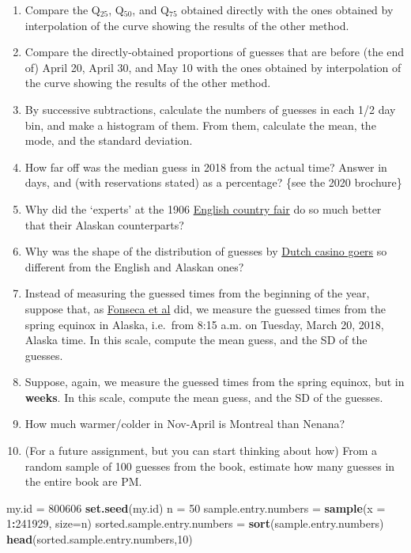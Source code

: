 \documentclass[]{book}
\newenvironment{Shaded}{\begin{snugshade}}{\end{snugshade}}
\newcommand{\DataTypeTok}[1]{\textcolor[rgb]{0.13,0.29,0.53}{#1}}
\newcommand{\DecValTok}[1]{\textcolor[rgb]{0.00,0.00,0.81}{#1}}
\newcommand{\KeywordTok}[1]{\textcolor[rgb]{0.13,0.29,0.53}{\textbf{#1}}}
\newcommand{\NormalTok}[1]{#1}
\newcommand{\OperatorTok}[1]{\textcolor[rgb]{0.81,0.36,0.00}{\textbf{#1}}}
\newcommand{\StringTok}[1]{\textcolor[rgb]{0.31,0.60,0.02}{#1}}
\begin{document}
\begin{enumerate}
\def\labelenumi{\arabic{enumi}.}
\setcounter{enumi}{2}
\item
  Compare the Q\(_{25}\), Q\(_{50}\), and Q\(_{75}\) obtained directly with the ones obtained by interpolation of the curve showing the results of the other method.
\item
  Compare the directly-obtained proportions of guesses that are before (the end of) April 20, April 30, and May 10 with the ones obtained by interpolation of the curve showing the results of the other method.
\item
  By successive subtractions, calculate the numbers of guesses in each 1/2 day bin, and make a histogram of them. From them, calculate the mean, the mode, and the standard deviation.
\item
  How far off was the median guess in 2018 from the actual time? Answer in days, and (with reservations stated) as a percentage? \{see the 2020 brochure\}
\item
  Why did the `experts' at the 1906 \href{http://galton.org/essays/1900-1911/galton-1907-vox-populi.pdf}{English country fair} do so much better that their Alaskan counterparts?
\item
  Why was the shape of the distribution of guesses by \href{http://www.medicine.mcgill.ca/epidemiology/hanley/bios691/The_wisdom_of_the_inner_crowd_.pdf}{Dutch casino goers} so different from the English and Alaskan ones?
\item
  Instead of measuring the guessed times from the beginning of the year, suppose that, as \href{http://www.medicine.mcgill.ca/epidemiology/hanley/bios691/VoxPopuliNenana.pdf}{Fonseca et al}
  did, we measure the guessed times from the spring equinox in Alaska, i.e.~from 8:15 a.m. on Tuesday, March 20, 2018, Alaska time. In this scale, compute the mean guess, and the SD of the guesses.
\item
  Suppose, again, we measure the guessed times from the spring equinox, but in \textbf{weeks}. In this scale, compute the mean guess, and the SD of the guesses.
\item
  How much warmer/colder in Nov-April is Montreal than Nenana?
\item
  (For a future assignment, but you can start thinking about how) From a random sample of 100 guesses from the book, estimate how many guesses in the entire book are PM.
\end{enumerate}

\begin{Shaded}
\begin{Highlighting}[]
\NormalTok{my.id =}\StringTok{ }\DecValTok{800606}
\KeywordTok{set.seed}\NormalTok{(my.id)}
\NormalTok{n =}\StringTok{ }\DecValTok{50}
\NormalTok{sample.entry.numbers =}\StringTok{ }\KeywordTok{sample}\NormalTok{(}\DataTypeTok{x =} \DecValTok{1}\OperatorTok{:}\DecValTok{241929}\NormalTok{, }\DataTypeTok{size=}\NormalTok{n)}
\NormalTok{sorted.sample.entry.numbers =}\StringTok{ }\KeywordTok{sort}\NormalTok{(sample.entry.numbers)}
\KeywordTok{head}\NormalTok{(sorted.sample.entry.numbers,}\DecValTok{10}\NormalTok{)}
\end{Highlighting}
\end{Shaded}
\end{document}
